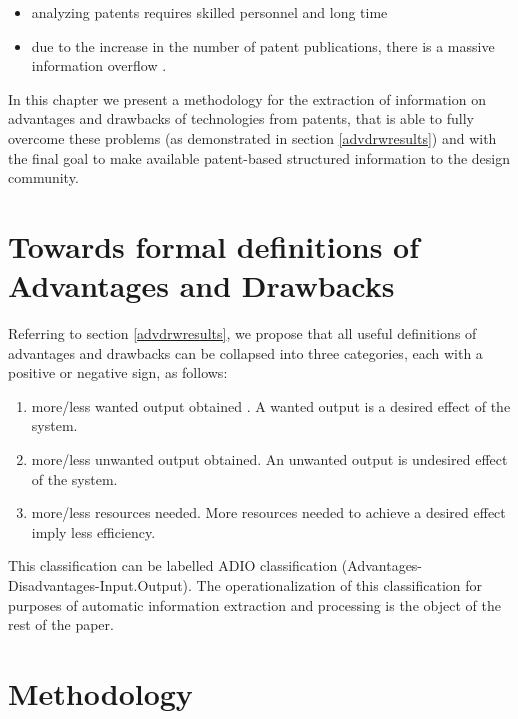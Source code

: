\documentclass[]{book}
\providecommand{\tightlist}{%
  \setlength{\itemsep}{0pt}\setlength{\parskip}{0pt}}
\begin{document}
\begin{itemize}
\tightlist
\item
  analyzing patents requires skilled personnel and long time
  \citep{leon2007trends}
\item
  due to the increase in the number of patent publications, there is a
  massive information overflow \citep{bergmann2008evaluating}.
\end{itemize}

In this chapter we present a methodology for the extraction of
information on advantages and drawbacks of technologies from patents,
that is able to fully overcome these problems (as demonstrated in
section \ref{advdrwresults}) and with the final goal to make available
patent-based structured information to the design community.

\section{Towards formal definitions of Advantages and
Drawbacks}\label{towards-formal-definitions-of-advantages-and-drawbacks}

Referring to section \ref{advdrwresults}, we propose that all useful
definitions of advantages and drawbacks can be collapsed into three
categories, each with a positive or negative sign, as follows:

\begin{enumerate}
\def\labelenumi{\arabic{enumi}.}
\tightlist
\item
  more/less wanted output obtained . A wanted output is a desired effect
  of the system.
\item
  more/less unwanted output obtained. An unwanted output is undesired
  effect of the system.
\item
  more/less resources needed. More resources needed to achieve a desired
  effect imply less efficiency.
\end{enumerate}

This classification can be labelled ADIO classification
(Advantages-Disadvantages-Input.Output). The operationalization of this
classification for purposes of automatic information extraction and
processing is the object of the rest of the paper.

\section{Methodology}\label{methodology-9}
\end{document}
